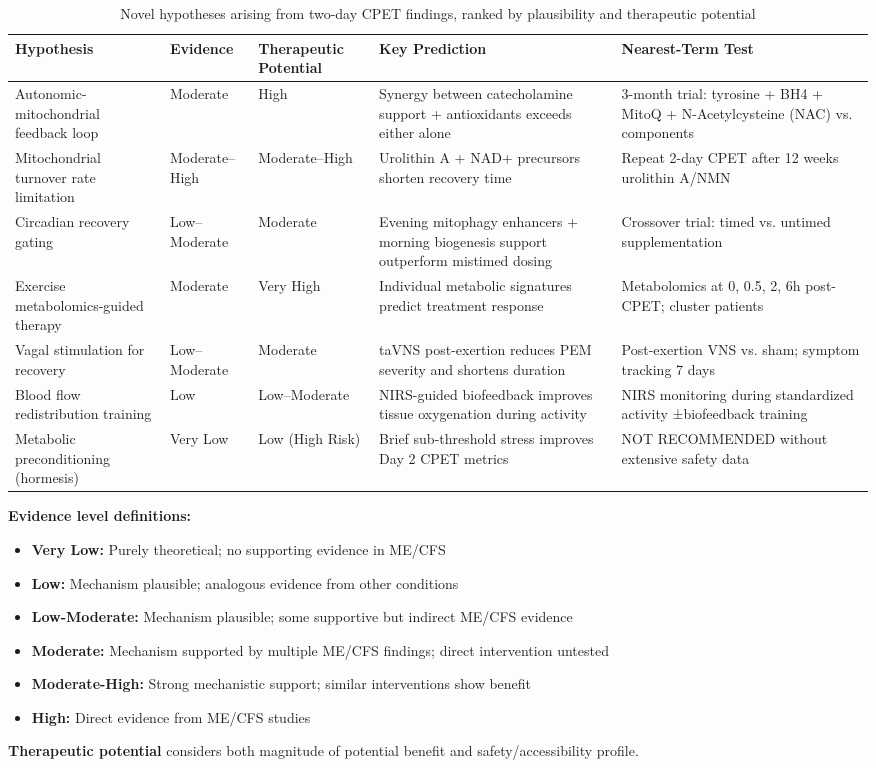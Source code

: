 \begin{table}[htbp]
\centering
\small
\caption{Novel hypotheses arising from two-day CPET findings, ranked by plausibility and therapeutic potential}
\label{tab:cpet-hypotheses}
\begin{tabularx}{\textwidth}{p{3.2cm}p{1.2cm}p{1.5cm}p{4.5cm}X}
\toprule
\textbf{Hypothesis} & \textbf{Evidence} & \textbf{Therapeutic Potential} & \textbf{Key Prediction} & \textbf{Nearest-Term Test} \\
\midrule
Autonomic-mitochondrial feedback loop & Moderate & High & Synergy between catecholamine support + antioxidants exceeds either alone & 3-month trial: tyrosine + BH4 + MitoQ + N-Acetylcysteine (NAC) vs. components \\
\midrule
Mitochondrial turnover rate limitation & Moderate--High & Moderate--High & Urolithin A + NAD+ precursors shorten recovery time & Repeat 2-day CPET after 12 weeks urolithin A/NMN \\
\midrule
Circadian recovery gating & Low--Moderate & Moderate & Evening mitophagy enhancers + morning biogenesis support outperform mistimed dosing & Crossover trial: timed vs. untimed supplementation \\
\midrule
Exercise metabolomics-guided therapy & Moderate & Very High & Individual metabolic signatures predict treatment response & Metabolomics at 0, 0.5, 2, 6h post-CPET; cluster patients \\
\midrule
Vagal stimulation for recovery & Low--Moderate & Moderate & taVNS post-exertion reduces PEM severity and shortens duration & Post-exertion VNS vs. sham; symptom tracking 7 days \\
\midrule
Blood flow redistribution training & Low & Low--Moderate & NIRS-guided biofeedback improves tissue oxygenation during activity & NIRS monitoring during standardized activity ±biofeedback training \\
\midrule
Metabolic preconditioning (hormesis) & Very Low & Low (High Risk) & Brief sub-threshold stress improves Day 2 CPET metrics & NOT RECOMMENDED without extensive safety data \\
\bottomrule
\end{tabularx}
\end{table}

\textbf{Evidence level definitions:}
\begin{itemize}
    \item \textbf{Very Low:} Purely theoretical; no supporting evidence in ME/CFS
    \item \textbf{Low:} Mechanism plausible; analogous evidence from other conditions
    \item \textbf{Low-Moderate:} Mechanism plausible; some supportive but indirect ME/CFS evidence
    \item \textbf{Moderate:} Mechanism supported by multiple ME/CFS findings; direct intervention untested
    \item \textbf{Moderate-High:} Strong mechanistic support; similar interventions show benefit
    \item \textbf{High:} Direct evidence from ME/CFS studies
\end{itemize}

\textbf{Therapeutic potential} considers both magnitude of potential benefit and safety/accessibility profile.




